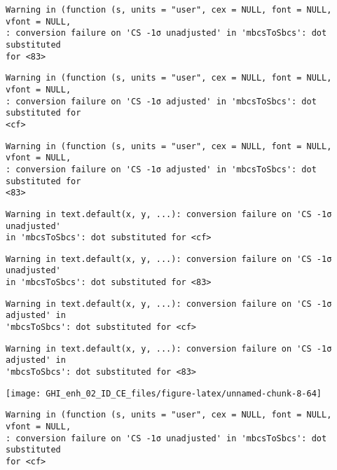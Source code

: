 \documentclass[
  10pt,
  a4paper,oneside]{article}
\begin{document}
\begin{verbatim}
Warning in (function (s, units = "user", cex = NULL, font = NULL, vfont = NULL,
: conversion failure on 'CS -1σ unadjusted' in 'mbcsToSbcs': dot substituted
for <83>
\end{verbatim}

\begin{verbatim}
Warning in (function (s, units = "user", cex = NULL, font = NULL, vfont = NULL,
: conversion failure on 'CS -1σ adjusted' in 'mbcsToSbcs': dot substituted for
<cf>
\end{verbatim}

\begin{verbatim}
Warning in (function (s, units = "user", cex = NULL, font = NULL, vfont = NULL,
: conversion failure on 'CS -1σ adjusted' in 'mbcsToSbcs': dot substituted for
<83>
\end{verbatim}

\begin{verbatim}
Warning in text.default(x, y, ...): conversion failure on 'CS -1σ unadjusted'
in 'mbcsToSbcs': dot substituted for <cf>
\end{verbatim}

\begin{verbatim}
Warning in text.default(x, y, ...): conversion failure on 'CS -1σ unadjusted'
in 'mbcsToSbcs': dot substituted for <83>
\end{verbatim}

\begin{verbatim}
Warning in text.default(x, y, ...): conversion failure on 'CS -1σ adjusted' in
'mbcsToSbcs': dot substituted for <cf>
\end{verbatim}

\begin{verbatim}
Warning in text.default(x, y, ...): conversion failure on 'CS -1σ adjusted' in
'mbcsToSbcs': dot substituted for <83>
\end{verbatim}

\begin{center}\texttt{[image: GHI\_enh\_02\_ID\_CE\_files/figure-latex/unnamed-chunk-8-64]} \end{center}

\begin{verbatim}
Warning in (function (s, units = "user", cex = NULL, font = NULL, vfont = NULL,
: conversion failure on 'CS -1σ unadjusted' in 'mbcsToSbcs': dot substituted
for <cf>
\end{verbatim}
\end{document}
